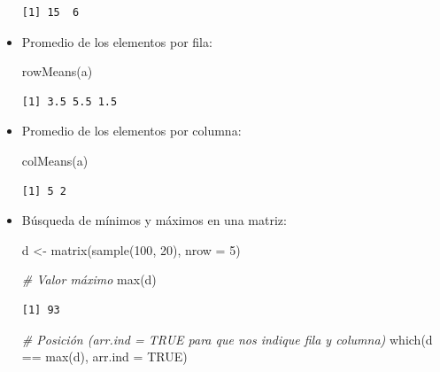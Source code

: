 \documentclass[
]{book}
\newenvironment{Shaded}{\begin{snugshade}}{\end{snugshade}}
\newcommand{\AttributeTok}[1]{\textcolor[rgb]{0.77,0.63,0.00}{#1}}
\newcommand{\CommentTok}[1]{\textcolor[rgb]{0.56,0.35,0.01}{\textit{#1}}}
\newcommand{\ConstantTok}[1]{\textcolor[rgb]{0.00,0.00,0.00}{#1}}
\newcommand{\DecValTok}[1]{\textcolor[rgb]{0.00,0.00,0.81}{#1}}
\newcommand{\FunctionTok}[1]{\textcolor[rgb]{0.00,0.00,0.00}{#1}}
\newcommand{\NormalTok}[1]{#1}
\newcommand{\OtherTok}[1]{\textcolor[rgb]{0.56,0.35,0.01}{#1}}
\newcommand{\SpecialCharTok}[1]{\textcolor[rgb]{0.00,0.00,0.00}{#1}}
\begin{document}
\begin{itemize}
\begin{verbatim}
[1] 15  6
\end{verbatim}
\item
  Promedio de los elementos por fila:

\begin{Shaded}
\begin{Highlighting}[]
\FunctionTok{rowMeans}\NormalTok{(a)}
\end{Highlighting}
\end{Shaded}

\begin{verbatim}
[1] 3.5 5.5 1.5
\end{verbatim}
\item
  Promedio de los elementos por columna:

\begin{Shaded}
\begin{Highlighting}[]
\FunctionTok{colMeans}\NormalTok{(a)}
\end{Highlighting}
\end{Shaded}

\begin{verbatim}
[1] 5 2
\end{verbatim}
\item
  Búsqueda de mínimos y máximos en una matriz:

\begin{Shaded}
\begin{Highlighting}[]
\NormalTok{d }\OtherTok{\textless{}{-}} \FunctionTok{matrix}\NormalTok{(}\FunctionTok{sample}\NormalTok{(}\DecValTok{100}\NormalTok{, }\DecValTok{20}\NormalTok{), }\AttributeTok{nrow =} \DecValTok{5}\NormalTok{)}

\CommentTok{\# Valor máximo}
\FunctionTok{max}\NormalTok{(d)}
\end{Highlighting}
\end{Shaded}

\begin{verbatim}
[1] 93
\end{verbatim}

\begin{Shaded}
\begin{Highlighting}[]
\CommentTok{\# Posición (arr.ind = TRUE para que nos indique fila y columna)}
\FunctionTok{which}\NormalTok{(d }\SpecialCharTok{==} \FunctionTok{max}\NormalTok{(d), }\AttributeTok{arr.ind =} \ConstantTok{TRUE}\NormalTok{)}
\end{Highlighting}
\end{Shaded}


\end{itemize}
\end{document}
